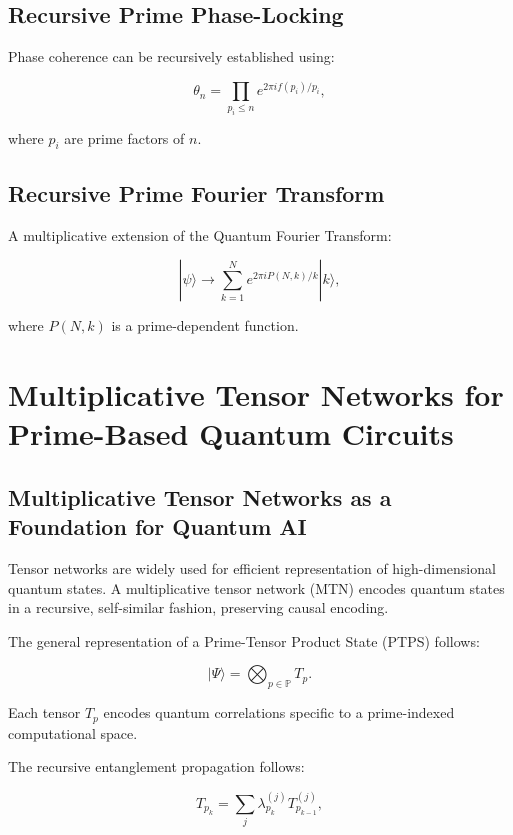 \documentclass{article}
\theoremstyle{plain}
\begin{document}
\subsection{Recursive Prime Phase-Locking}
Phase coherence can be recursively established using:

\begin{equation}
\theta_n = \prod_{p_i \leq n} e^{2\pi i f(p_i) / p_i},
\end{equation}

where \( p_i \) are prime factors of \( n \).

\subsection{Recursive Prime Fourier Transform}
A multiplicative extension of the Quantum Fourier Transform:

\begin{equation}
|\psi\rangle \to \sum_{k=1}^{N} e^{2\pi i P(N,k) / k} |k\rangle,
\end{equation}

where \( P(N,k) \) is a prime-dependent function.

\section{Multiplicative Tensor Networks for Prime-Based Quantum Circuits}

\subsection{Multiplicative Tensor Networks as a Foundation for Quantum AI}

Tensor networks are widely used for efficient representation of high-dimensional quantum states. A multiplicative tensor network (MTN) encodes quantum states in a recursive, self-similar fashion, preserving causal encoding.

The general representation of a Prime-Tensor Product State (PTPS) follows:

\begin{equation}
|\Psi\rangle = \bigotimes_{p \in \mathbb{P}} T_p.
\end{equation}

Each tensor \( T_p \) encodes quantum correlations specific to a prime-indexed computational space.

The recursive entanglement propagation follows:

\begin{equation}
T_{p_k} = \sum_{j} \lambda_{p_k}^{(j)} T_{p_{k-1}}^{(j)},
\end{equation}
\end{document}
